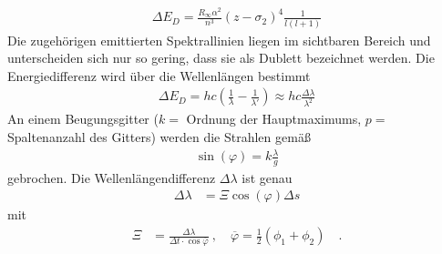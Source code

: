 \begin{align}
	\Delta E_D = \frac{R_\infty\alpha^2}{n^3}(z-\sigma_2)^4\frac{1}{l(l+1)}
\end{align}
Die zugehörigen emittierten Spektrallinien liegen im sichtbaren Bereich und unterscheiden sich nur so gering, dass sie als Dublett bezeichnet werden. Die Energiedifferenz wird über die Wellenlängen bestimmt
\begin{align}
	\Delta E_D = hc\left(\frac{1}{\lambda}-\frac{1}{\lambda'}\right) \approx hc\frac{\Delta \lambda}{\lambda^2}
\end{align}
An einem Beugungsgitter ($k =$ Ordnung der Hauptmaximums, $p =$ Spaltenanzahl des Gitters) werden die Strahlen gemäß
\begin{align}
	\sin(\varphi) = k\frac{\lambda}{g}
\end{align}
gebrochen.
Die Wellenlängendifferenz $\Delta \lambda$ ist genau
\begin{align}
	\Delta \lambda &= \Xi \cos(\varphi)\Delta s
\end{align}	
mit
\begin{align}
	\Xi &= \frac{\Delta\lambda}{\Delta t\cdot\cos\overline{\varphi}} \ , \quad \overline{\varphi} = \frac{1}{2}(\phi_1 + \phi_2) \quad .
\end{align}